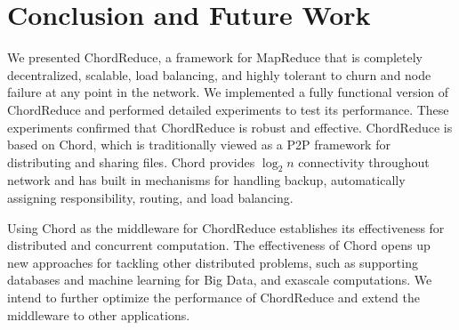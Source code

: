 \documentclass[10pt, conference, compsocconf]{IEEEtran}
\begin{document}
\section{Conclusion and Future Work}
We presented ChordReduce, a framework for MapReduce that is completely decentralized, scalable, load balancing, and highly tolerant to churn and node failure at any point in the network. We implemented a fully functional version of ChordReduce and performed detailed experiments to test its performance. These experiments confirmed that ChordReduce is robust and effective. ChordReduce is based on Chord, which is traditionally viewed as a P2P framework for distributing and sharing files.  Chord provides $\log_{2} n$ connectivity throughout network and has built in mechanisms for handling backup, automatically assigning responsibility, routing, and load balancing. 



Using Chord as the middleware for ChordReduce establishes its effectiveness for distributed and concurrent computation.
The effectiveness of Chord opens up new approaches for tackling other distributed problems, such as supporting databases and machine learning for Big Data, and exascale computations. We intend to further optimize the performance of ChordReduce and extend the middleware to other applications.






\end{document}
